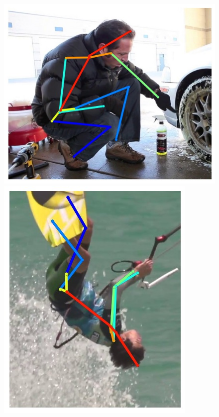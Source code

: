 \begin{figure}[t!]
    \centering
    \newcommand{\flowh}{0.28\columnwidth}
    \includegraphics[height=\flowh]{Figures/pose/qualitative/pred-1}
    \hfill
    \includegraphics[height=\flowh]{Figures/pose/qualitative/pred-2}
    \hfill

\end{figure}
